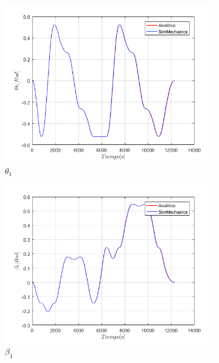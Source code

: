 \begin{figure}
    \centering
    \begin{subfigure}{0.45\textwidth}
        \includegraphics[width=\linewidth]{Cap4_DisenoBasico/Figura/ComparativoSimMechanics/Theta1.png}
        \caption{$\theta_1$}
    \end{subfigure}
    \begin{subfigure}{0.45\textwidth}
        \includegraphics[width=\linewidth]{Cap4_DisenoBasico/Figura/ComparativoSimMechanics/Beta1.png}
        \caption{$\beta_1$}
    \end{subfigure}
    \begin{subfigure}{0.45\textwidth}

\end{subfigure}
\end{figure}
